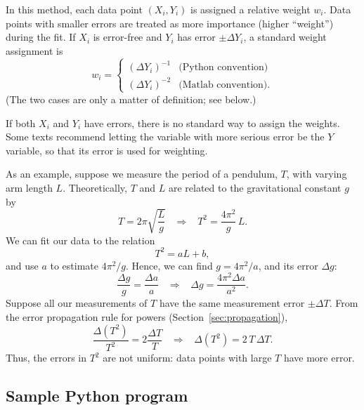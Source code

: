 \documentclass[11pt,a4paper]{article}
\begin{document}
In this method, each data point $(X_i,Y_i)$ is assigned a relative
weight $w_i$.  Data points with smaller errors are treated as more
importance (higher ``weight'') during the fit.  If $X_i$ is error-free
and $Y_i$ has error $\pm \Delta Y_i$, a standard weight assignment is
\begin{equation*}
  w_i = \begin{cases} (\Delta Y_i)^{-1} & \textrm{(Python convention)} \\
    (\Delta Y_i)^{-2} & \textrm{(Matlab convention).}
  \end{cases}
\end{equation*}
(The two cases are only a matter of definition; see below.)

If both $X_i$ and $Y_i$ have errors, there is no standard way to
assign the weights.  Some texts recommend letting the variable with
more serious error be the $Y$ variable, so that its error is used for
weighting.

As an example, suppose we measure the period of a pendulum, $T$, with
varying arm length $L$.  Theoretically, $T$ and $L$ are related to the
gravitational constant $g$ by
\begin{equation*}
  T = 2\pi \sqrt{\frac{L}{g}} \;\;\; \Rightarrow \;\;\; T^2 = \frac{4\pi^2}{g} \, L.
\end{equation*}
We can fit our data to the relation
\begin{equation*}
  T^2 = a L + b,
\end{equation*}
and use $a$ to estimate $4\pi^2/g$.  Hence, we can find $g =
4\pi^2/a$, and its error $\Delta g$:
\begin{equation*}
  \frac{\Delta g}{g} = \frac{\Delta a}{a} \;\;\;\Rightarrow\;\;\;
  \Delta g = \frac{4\pi^2\Delta a}{a^2}.
\end{equation*}
Suppose all our measurements of $T$ have the same measurement error
$\pm \Delta T$.  From the error propagation rule for powers
(Section~\ref{sec:propagation}),
\begin{equation*}
  \frac{\Delta (T^2)}{T^2} = 2 \frac{\Delta T}{T} \;\;\;\Rightarrow
  \;\;\; \Delta (T^2) = 2\,T\,\Delta T.
\end{equation*}
Thus, the errors in $T^2$ are not uniform: data points with large $T$
have more error.

\subsection{Sample Python program}
\end{document}
